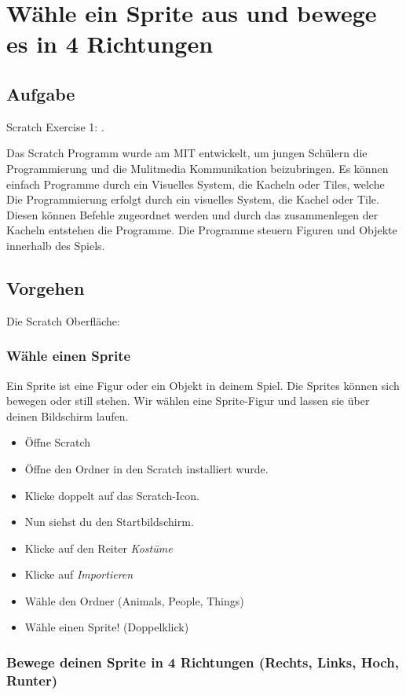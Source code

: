 \section{Wähle ein Sprite aus und bewege es in 4 Richtungen}
\subsection{Aufgabe}
Scratch Exercise 1: .

Das Scratch Programm wurde am MIT entwickelt, um jungen Schülern die Programmierung und die Mulitmedia Kommunikation beizubringen. 
Es können einfach Programme durch ein Visuelles System, die Kacheln oder Tiles, welche 
Die Programmierung erfolgt durch ein visuelles System, die Kachel oder Tile. Diesen können Befehle zugeordnet werden und durch das zusammenlegen der Kacheln entstehen die Programme. Die Programme steuern Figuren und Objekte innerhalb des Spiels.


\subsection{Vorgehen}
Die Scratch Oberfläche:


\subsubsection{Wähle einen Sprite}

Ein Sprite ist eine Figur oder ein Objekt in deinem Spiel. Die Sprites können sich bewegen oder still stehen. Wir wählen eine Sprite-Figur und lassen sie über deinen Bildschirm laufen.
\begin{itemize}
\item Öffne Scratch
\item Öffne den Ordner in den Scratch installiert wurde.
\item Klicke doppelt auf das Scratch-Icon.
\item Nun siehst du den Startbildschirm. 
\item Klicke auf den Reiter \it{Kostüme}
\item Klicke auf \it{Importieren}
\item Wähle den Ordner (Animals, People, Things)
\item Wähle einen  Sprite! (Doppelklick)
\end{itemize}

\subsubsection{Bewege deinen Sprite in 4 Richtungen (Rechts, Links, Hoch, Runter)}

